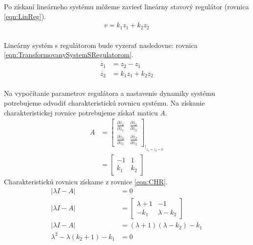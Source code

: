 \documentclass[../main.tex]{subfiles}
\begin{document}
Po získaní lineárneho systému môžeme zaviesť lineárny stavový regulátor (rovnica \ref{eqn:LinReg}).
\begin{equation}
	\begin{split}
		v = k_1z_1 + k_2z_2 \\
	\end{split}
	\label{eqn:LinReg}
\end{equation}

Lineárny systém s regulátorom bude vyzerať nasledovne: rovnica \ref{eqn:TransformovanySystemSRegulatorom}. 
\begin{equation}
	\begin{split}
	\dot{z_1}  & = z_2 - z_1 \\
	 \dot{z_2} & = k_1z_1 + k_2z_2 \\
	\end{split}
	\label{eqn:TransformovanySystemSRegulatorom}
\end{equation}

Na vypočítanie parametrov regulátora a nastavenie dynamiky systému potrebujeme odvodiť charakteristickú rovnicu systému.
Na získanie charakteristickej rovnice potrebujeme získať maticu $A$.
\begin{equation}
\begin{split} 
 A  & = \begin{bmatrix} \frac{\partial \dot{z_1}}{\partial z_1}& \frac{\partial \dot{z_1}}{\partial z_2}\\ \frac{\partial \dot{z_2}}{\partial z_1}&\frac{\partial \dot{z_2}}{\partial z_2} \end{bmatrix}_{|_{z_1 = z_2 = 0}} \\
 & = \begin{bmatrix} -1 & 1\\ k_1 & k_2 \end{bmatrix} \
 \end{split}
 \label{eqn:A}
\end{equation}
Charakteristickú rovnicu získame z rovnice \ref{eqn:CHR}.
\begin{equation}
\begin{split} 
 |\lambda I - A| & = 0\\
|\lambda I - A| & = \begin{bmatrix} \lambda +1 & -1\\ -k_1 & \lambda -k_2 \end{bmatrix} \\
|\lambda I - A| & = (\lambda + 1)(\lambda - k_2) - k_1\\
\lambda^2 - \lambda(k_2+1) - k_1 &= 0\\ 
\end{split}
\label{eqn:CHR}
\end{equation}
\end{document}
